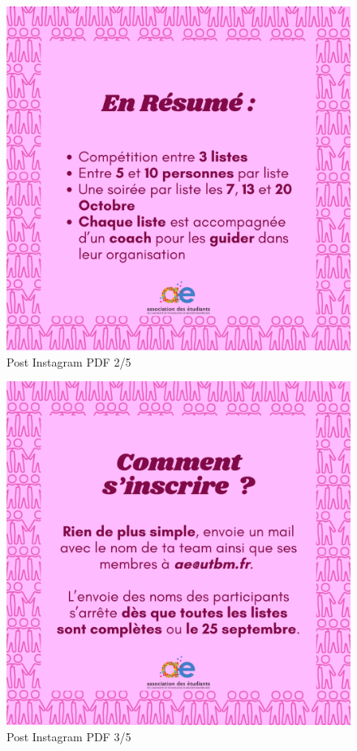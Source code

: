 \begin{figure}[!h]
    \begin{center}
        \includegraphics[scale=0.2]{ressources/post pdf/19}
        \caption{Post Instagram \gls{PDF} 2/5 \label{fig:pdf2}}
    \end{center}
\end{figure}

\begin{figure}[!h]
    \begin{center}
        \includegraphics[scale=0.2]{ressources/post pdf/20}
        \caption{Post Instagram \gls{PDF} 3/5 \label{fig:pdf3}}
    \end{center}
\end{figure}


